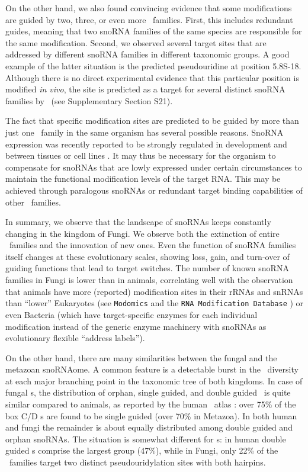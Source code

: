 On the other hand, we also found convincing evidence that some
modifications are guided by two, three, or even more \sno\
families. First, this includes redundant guides, meaning that two
snoRNA families of the same species are responsible for the same
modification. Second, we observed several target sites that are
addressed by different snoRNA families in different taxonomic
groups. A good example of the latter situation is the predicted
pseudouridine at position 5.8S-18. Although there is no direct
experimental evidence that this particular position is modified
\emph{in vivo}, the site is predicted as a target for several distinct
snoRNA families by \snoop\ (see Supplementary Section S21).

The fact that specific modification sites are predicted to be guided
by more than just one \sno\ family in the same organism has several
possible reasons. SnoRNA expression was recently reported to be
strongly regulated in development and between tissues or cell lines
\cite{Kapushesky:2012, Jorjani:2016}. It may thus be necessary for the
organism to compensate for snoRNAs that are lowly expressed under
certain circumstances to maintain the functional modification levels
of the target RNA. This may be achieved through paralogous snoRNAs or
redundant target binding capabilities of other \sno\ families.

In summary, we observe that the landscape of snoRNAs keeps constantly
changing in the kingdom of Fungi. We observe both the extinction of
entire \sno\ families and the innovation of new ones. Even the
function of snoRNA families itself changes at these evolutionary
scales, showing loss, gain, and turn-over of guiding functions that
lead to target switches. The number of known snoRNA families in Fungi
is lower than in animals, correlating well with the observation that
animals have more (reported) modification sites in their rRNAs and
snRNAs than ``lower'' Eukaryotes (see \texttt{Modomics} and the
\texttt{RNA Modification Database} \cite{Machnicka:2013,
Cantara:2011}) or even Bacteria (which have target-specific enzymes
for each individual modification instead of the generic enzyme
machinery with snoRNAs as evolutionary flexible ``address labels'').

On the other hand, there are many similarities between the fungal and
the metazoan snoRNAome.  A common feature is a detectable burst in
the \sno\ diversity at each major branching point in the taxonomic
tree of both kingdoms.  In case of fungal \cd s, the distribution of orphan,
single guided, and double guided \snos\ is quite similar compared
to animals, as reported by the human \sno\ atlas
\citep{Jorjani:2016}: over 75\% of the box C/D \sno s
are found to be single guided (over 70\% in Metazoa).  In both human and
fungi the remainder is about equally distributed among double guided and
orphan snoRNAs. The situation is somewhat different for \haca s: in
human double guided \sno s comprise the largest group (47\%), while in
Fungi, only 22\% of the \haca\ families target two distinct
pseudouridylation sites with both hairpins.

